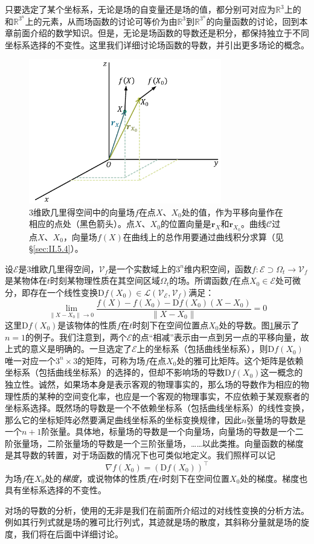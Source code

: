 \documentclass[../main.tex]{subfiles}
\begin{document}
只要选定了某个坐标系，无论是场的自变量还是场的值，都分别可对应为$\mathbb{R}^3$上的和$\mathbb{R}^{3^n}$上的元素，从而场函数的讨论可等价为由$\mathbb{R}^3$到$\mathbb{R}^{3^n}$的向量函数的讨论，回到本章前面介绍的数学知识。但是，无论是场函数的导数还是积分，都保持独立于不同坐标系选择的不变性。这里我们详细讨论场函数的导数，并引出更多场论的概念。

\begin{figure}[h]
    \centering
    \includegraphics[width=0.75\textwidth]{images/vector_field_derivative.pdf}
    \caption{3维欧几里得空间中的向量场$f$在点$X$、$X_0$处的值，作为平移向量作在相应的点处（黑色箭头）。点$X$、$X_0$的位置向量是$\mathbf{r}_X$和$\mathbf{r}_{X_0}$。曲线$\mathcal{C}$过点$X$、$X_0$，向量场$f\left(X\right)$在曲线上的总作用要通过曲线积分求算（见\S\ref{sec:II.5.4}）。}
    \label{fig:II.5.1}
\end{figure}

设$\mathcal{E}$是3维欧几里得空间，$\mathcal{V}_f$是一个实数域上的$3^n$维内积空间，函数$f:\mathcal{E}\supset\Omega_t\rightarrow\mathcal{V}_f$是某物体在$t$时刻某物理性质在其空间区域$\Omega_t$的场。所谓函数$f$在点$X_0\in\mathcal{E}$处可微分，即存在一个线性变换$\mathrm{D}f\left(X_0\right)\in\mathcal{L}\left(\mathcal{V}_\mathcal{E},\mathcal{V}_f\right)$满足：
\[\lim_{\left\|X-X_0\right\|\to 0}\frac{f\left(X\right)-f\left(X_0\right)-\mathrm{D}f\left(X_0\right)\left(X-X_0\right)}{\left\|X-X_0\right\|}=0\]
这里$\mathrm{D}f\left(X_0\right)$是该物体的性质$f$在$t$时刻下在空间位置点$X_0$处的导数。图\ref{fig:II.5.1}展示了$n=1$的例子。我们注意到，两个$\mathcal{E}$的点“相减”表示由一点到另一点的平移向量，故上式的意义是明确的。一旦选定了$\mathcal{E}$上的坐标系（包括曲线坐标系），则$\mathrm{D}f\left(X_0\right)$唯一对应一个$3^n\times 3$的矩阵，可称为场$f$在点$X_0$处的雅可比矩阵。这个矩阵是依赖坐标系（包括曲线坐标系）的选择的，但却不影响场的导数$\mathrm{D}f\left(X_0\right)$这一概念的独立性。诚然，如果场本身是表示客观的物理事实的，那么场的导数作为相应的物理性质的某种的空间变化率，也应是一个客观的物理事实，不应依赖于某观察者的坐标系选择。既然场的导数是一个不依赖坐标系（包括曲线坐标系）的线性变换，那么它的坐标矩阵必然要满足曲线坐标系的坐标变换规律，因此$n$张量场的导数是一个$n+1$阶张量。具体地，标量场的导数是一个向量场，向量场的导数是一个二阶张量场，二阶张量场的导数是一个三阶张量场，……以此类推。向量函数的梯度是其导数的转置，对于场函数的情况下也可类似地定义。我们照样可以记
\[\nabla f\left(X_0\right)=\left(\mathrm{D}f\left(X_0\right)\right)^\intercal\]
为场$f$在$X_0$处的\emph{梯度}，或说物体的性质$f$在$t$时刻下在空间位置$X_0$处的梯度。梯度也具有坐标系选择的不变性。

对场的导数的分析，使用的无非是我们在前面所介绍过的对线性变换的分析方法。例如其行列式就是场的雅可比行列式，其迹就是场的散度，其斜称分量就是场的旋度，我们将在后面中详细讨论。
\end{document}
